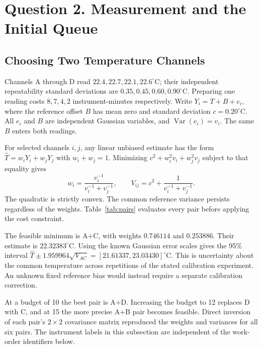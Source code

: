 \documentclass{swmcmthesis}
\begin{document}
\clearpage
\section{Question 2. Measurement and the Initial Queue}
\subsection{Choosing Two Temperature Channels}
Channels A through D read \(22.4,22.7,22.1,22.6^\circ\mathrm C\); their independent repeatability standard deviations are \(0.35,0.45,0.60,0.90^\circ\mathrm C\). Preparing one reading costs \(8,7,4,2\) instrument-minutes respectively. Write \(Y_i=T+B+e_i\), where the reference offset \(B\) has mean zero and standard deviation \(c=0.20^\circ\mathrm C\). All \(e_i\) and \(B\) are independent Gaussian variables, and \(\operatorname{Var}(e_i)=v_i\). The same \(B\) enters both readings.

For selected channels \(i,j\), any linear unbiased estimate has the form \(\hat T=w_iY_i+w_jY_j\) with \(w_i+w_j=1\). Minimizing \(c^2+w_i^2v_i+w_j^2v_j\) subject to that equality gives
\begin{equation}
 w_i=\frac{v_i^{-1}}{v_i^{-1}+v_j^{-1}},\qquad
 V_{ij}=c^2+\frac{1}{v_i^{-1}+v_j^{-1}} .
\end{equation}
The quadratic is strictly convex. The common reference variance persists regardless of the weights. Table~\ref{tab:pairs} evaluates every pair before applying the cost constraint.

\begin{table}[H]\centering
\caption{Pair selection at the 12 instrument-minute budget.}\label{tab:pairs}
\PairTable
\end{table}

The feasible minimum is A+C, with weights \(0.746114\) and \(0.253886\). Their estimate is \(22.32383^\circ\mathrm C\). Using the known Gaussian error scales gives the 95\% interval \(\hat T\pm1.959964\sqrt{V_{AC}}=[21.61337,23.03430]^\circ\mathrm C\). This is uncertainty about the common temperature across repetitions of the stated calibration experiment. An unknown fixed reference bias would instead require a separate calibration correction.

At a budget of 10 the best pair is A+D. Increasing the budget to 12 replaces D with C, and at 15 the more precise A+B pair becomes feasible. Direct inversion of each pair's \(2\times2\) covariance matrix reproduced the weights and variances for all six pairs. The instrument labels in this subsection are independent of the work-order identifiers below.
\end{document}
